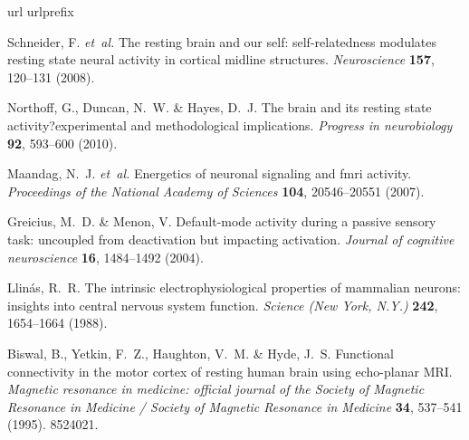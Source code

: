 \documentclass[11pt, onecolumn]{article}
\begin{document}
%

%
\begin{thebibliography}{10}
\expandafter\ifx\csname url\endcsname\relax
  \def\url#1{\texttt{#1}}\fi
\expandafter\ifx\csname urlprefix\endcsname\relax\def\urlprefix{URL }\fi
\providecommand{\bibinfo}[2]{#2}
\providecommand{\eprint}[2][]{\url{#2}}

\bibinfo{author}{Schneider, F.} \emph{et~al.}
\newblock \bibinfo{title}{The resting brain and our self: self-relatedness
  modulates resting state neural activity in cortical midline structures}.
\newblock \emph{\bibinfo{journal}{Neuroscience}}
  \textbf{\bibinfo{volume}{157}}, \bibinfo{pages}{120--131}
  (\bibinfo{year}{2008}).

\bibinfo{author}{Northoff, G.}, \bibinfo{author}{Duncan, N.~W.} \&
  \bibinfo{author}{Hayes, D.~J.}
\newblock \bibinfo{title}{The brain and its resting state activity?experimental
  and methodological implications}.
\newblock \emph{\bibinfo{journal}{Progress in neurobiology}}
  \textbf{\bibinfo{volume}{92}}, \bibinfo{pages}{593--600}
  (\bibinfo{year}{2010}).

\bibinfo{author}{Maandag, N.~J.} \emph{et~al.}
\newblock \bibinfo{title}{Energetics of neuronal signaling and fmri activity}.
\newblock \emph{\bibinfo{journal}{Proceedings of the National Academy of
  Sciences}} \textbf{\bibinfo{volume}{104}}, \bibinfo{pages}{20546--20551}
  (\bibinfo{year}{2007}).

\bibinfo{author}{Greicius, M.~D.} \& \bibinfo{author}{Menon, V.}
\newblock \bibinfo{title}{Default-mode activity during a passive sensory task:
  uncoupled from deactivation but impacting activation}.
\newblock \emph{\bibinfo{journal}{Journal of cognitive neuroscience}}
  \textbf{\bibinfo{volume}{16}}, \bibinfo{pages}{1484--1492}
  (\bibinfo{year}{2004}).

\bibinfo{author}{Llin{\'a}s, R.~R.}
\newblock \bibinfo{title}{The intrinsic electrophysiological properties of
  mammalian neurons: insights into central nervous system function}.
\newblock \emph{\bibinfo{journal}{Science (New York, N.Y.)}}
  \textbf{\bibinfo{volume}{242}}, \bibinfo{pages}{1654--1664}
  (\bibinfo{year}{1988}).

\bibinfo{author}{Biswal, B.}, \bibinfo{author}{Yetkin, F.~Z.},
  \bibinfo{author}{Haughton, V.~M.} \& \bibinfo{author}{Hyde, J.~S.}
\newblock \bibinfo{title}{Functional connectivity in the motor cortex of
  resting human brain using echo-planar {MRI}}.
\newblock \emph{\bibinfo{journal}{Magnetic resonance in medicine: official
  journal of the Society of Magnetic Resonance in Medicine / Society of
  Magnetic Resonance in Medicine}} \textbf{\bibinfo{volume}{34}},
  \bibinfo{pages}{537--541} (\bibinfo{year}{1995}).
\newblock \bibinfo{note}{{PMID:} 8524021}.


\end{thebibliography}
\end{document}
